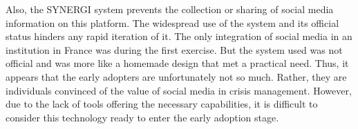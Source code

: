 Also, the SYNERGI system prevents the collection or sharing of social media information on this platform.
The widespread use of the system and its official status hinders any rapid iteration of it.
The only integration of social media in an institution in France was during the first exercise.
But the system used was not official and was more like a homemade design that met a practical need.
Thus, it appears that the early adopters are unfortunately not so much.
Rather, they are individuals convinced of the value of social media in crisis management.
However, due to the lack of tools offering the necessary capabilities, it is difficult to consider this technology ready to enter the early adoption stage.

